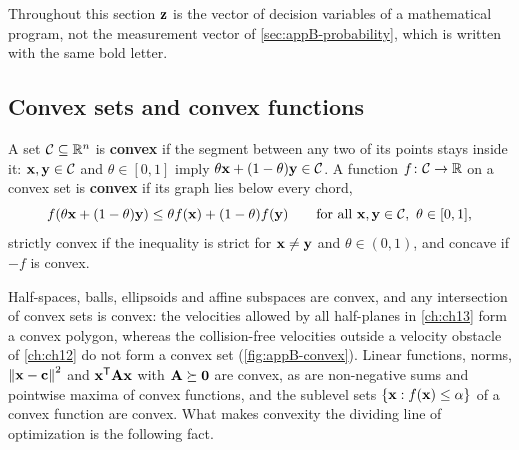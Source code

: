 Throughout this section $\mathbf{z}$ is the vector of decision variables of a
mathematical program, not the measurement vector of
\cref{sec:appB-probability}, which is written with the same bold letter.

\subsection{Convex sets and convex functions}

\begin{definition}
\label{def:appB-convex}
A set $\mathcal{C} \subseteq \mathbb{R}^n$ is \textbf{convex} if the segment between any two of its points stays inside it: $\mathbf{x}, \mathbf{y} \in \mathcal{C}$ and $\theta \in [0, 1]$ imply $\theta\mathbf{x} + (1 - \theta)\mathbf{y} \in \mathcal{C}$. A function $f\colon \mathcal{C} \to \mathbb{R}$ on a convex set is \textbf{convex} if its graph lies below every chord,
\begin{equation}
  f(\theta\mathbf{x} + (1 - \theta)\mathbf{y}) \le \theta f(\mathbf{x}) + (1 - \theta) f(\mathbf{y})\qquad \text{for all } \mathbf{x}, \mathbf{y} \in \mathcal{C},\ \theta \in [0, 1],
  \label{eq:appB-convex}
\end{equation}
strictly convex if the inequality is strict for $\mathbf{x} \ne \mathbf{y}$ and $\theta \in (0, 1)$, and concave if $-f$ is convex.
\end{definition}

Half-spaces, balls, ellipsoids and affine subspaces are convex, and any
intersection of convex sets is convex: the velocities allowed by all \orca
half-planes in \cref{ch:ch13} form a convex polygon, whereas the
collision-free velocities outside a velocity obstacle of \cref{ch:ch12} do not
form a convex set (\cref{fig:appB-convex}). Linear functions, norms,
$\left\lVert \mathbf{x} - \mathbf{c} \right\rVert^2$ and $\mathbf{x}^{\mathsf{T}}\mathbf{A}\mathbf{x}$ with $\mathbf{A}
\succeq \mathbf{0}$ are convex, as are non-negative sums and pointwise maxima of
convex functions, and the sublevel sets $\left\{ \mathbf{x} : f(\mathbf{x}) \le
\alpha \right\}$ of a convex function are convex. What makes convexity the dividing
line of optimization is the following fact.

